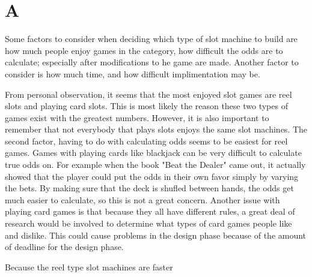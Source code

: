 \documentclass{article}
\begin{document}
\section{A}

Some factors to consider when deciding which type of slot machine to build
are how much people enjoy games in the category, how difficult the odds are to calculate; especially after modifications to he game are made.  Another factor to consider is how much time, and how difficult implimentation may be.

From personal observation, it seems that the most enjoyed slot games are reel slots and playing card slots. This is most likely the reason these two types of games exist with the greatest numbers.  However, it is also important to remember that not everybody that plays slots enjoys the same slot machines.  The second factor, having to do with calculating odds seems to be easiest for reel games.  Games with playing cards like blackjack can be very difficult to calculate true odds on.  For example when the book "Beat the Dealer" came out, it actually showed that the player could put the odds in their own favor simply by varying the bets.  By making sure that the deck is shufled between hands, the odds get much easier to calculate, so this is not a great concern.  Another issue with playing card games is that because they all have different rules, a great deal of research would be involved to determine what types of card games people like and dislike.  This could cause problems in the design phase because of the amount of deadline for the design phase.

Because the reel type slot machines are faster  
\end{document}
